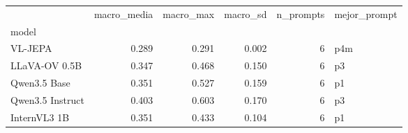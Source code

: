 \begin{tabular}{lrrrrl}
\toprule
 & macro\_media & macro\_max & macro\_sd & n\_prompts & mejor\_prompt \\
model &  &  &  &  &  \\
\midrule
VL-JEPA & 0.289 & 0.291 & 0.002 & 6 & p4m \\
LLaVA-OV 0.5B & 0.347 & 0.468 & 0.150 & 6 & p3 \\
Qwen3.5 Base & 0.351 & 0.527 & 0.159 & 6 & p1 \\
Qwen3.5 Instruct & 0.403 & 0.603 & 0.170 & 6 & p3 \\
InternVL3 1B & 0.351 & 0.433 & 0.104 & 6 & p1 \\
\bottomrule
\end{tabular}
